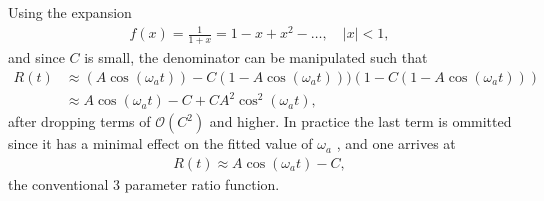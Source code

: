 Using the expansion 
	\begin{align}
		f(x) = \frac{1}{1+x} = 1 - x + x^2 - \dots, \quad |x| < 1,
	\end{align}
and since $C$ is small, the denominator can be manipulated such that
	\begin{equation}
	\begin{aligned}
		R(t) &\approx (A \cos(\omega_{a}t)) - C (1 - A \cos(\omega_{a}t)))(1 - C (1 - A \cos(\omega_{a}t))) \\
		     &\approx A \cos(\omega_{a}t) - C + C A^{2} \cos^2(\omega_{a}t),
	\end{aligned}
	\end{equation}
after dropping terms of $\mathcal{O}(C^{2})$ and higher. In practice the last term is ommitted since it has a minimal effect on the fitted value of $\omega_{a}$ \cite{LDThesis}, and one arrives at
	\begin{align}
		R(t) \approx A \cos(\omega_{a}t) - C,
	\end{align}
the conventional 3 parameter ratio function.


